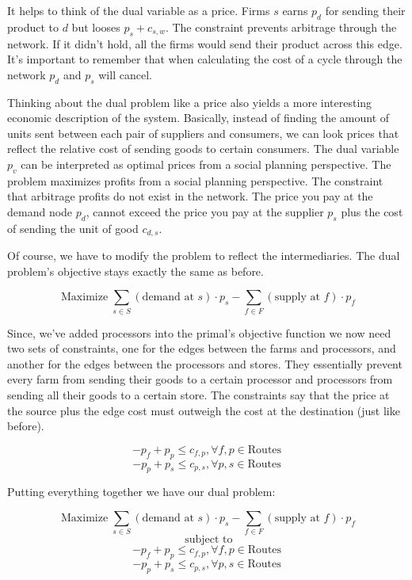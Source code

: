 \documentclass{report}
\begin{document}
It helps to think of the dual variable as a price. Firms $s$ earns $p_d$ for sending their product to $d$ but looses $p_s + c_{s,w}$. The constraint prevents arbitrage through the network. If it didn't hold, all the firms would send their product across this edge. It's important to remember that when calculating the cost of a cycle through the network $p_d$ and $p_s$ will cancel. 

Thinking about the dual problem like a price also yields a more interesting economic description of the system. Basically, instead of finding the amount of units sent between each pair of suppliers and consumers, we can look prices that reflect the relative cost of sending goods to certain consumers. The dual variable $p_v$ can be interpreted as optimal prices from a social planning perspective. The problem maximizes profits from a social planning perspective. The constraint that arbitrage profits do not exist in the network. The price you pay at the demand node $p_d$, cannot exceed the price you pay at the supplier $p_s$ plus the cost of sending the unit of good $c_{d,s}$.

Of course, we have to modify the problem to reflect the intermediaries. The dual problem's objective stays exactly the same as before.

$$\operatorname{Maximize} \sum_{s \in S}  (\text{demand at } s) \cdot p_{s} -   \sum_{f \in F}  (\text{supply at } f) \cdot p_{f} $$

Since, we've added processors into the primal's objective function we now need two sets of constraints, one for the edges between the farms and processors, and another for the edges between the processors and stores. They essentially prevent every farm from sending their goods to a certain processor and processors from sending all their goods to a certain store. The constraints say that the price at the source plus the edge cost must outweigh the cost at the destination (just like before).

$$ -p_f + p_p \leq c_{f,p}, \forall f,p\in \textrm{Routes}$$
$$ -p_p + p_s \leq c_{p,s}, \forall p,s\in \textrm{Routes}$$

Putting everything together we have our dual problem:

$$\operatorname{Maximize} \sum_{s \in S}  (\text{demand at } s) \cdot p_{s} -   \sum_{f \in F}  (\text{supply at } f) \cdot p_{f} $$
$$ \text{ subject to}$$
$$ -p_f + p_p \leq c_{f,p}, \forall f,p\in \textrm{Routes}$$
$$ -p_p + p_s \leq c_{p,s}, \forall p,s\in \textrm{Routes}$$
\end{document}
